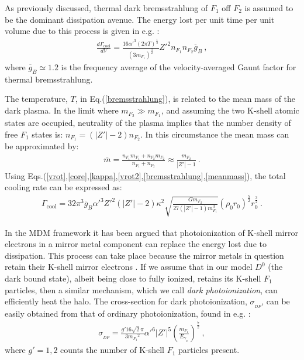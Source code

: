\documentclass[12pt]{article}
\begin{document}
{{As previously discussed, thermal dark bremsstrahlung of $F _1$ off $F
_2$ is assumed to be the dominant dissipation avenue. The energy lost
per unit time per unit volume due to this process is given in e.g.
\cite{radiative}:
%
\begin{eqnarray}
\frac{d\Gamma _{\text{cool}}}{dV} = \frac{16 {\alpha '} ^3 (2\pi T)
^{\frac{1}{2}}}{(3 m _{F_1} ) ^{\frac{3}{2}}} {Z '} ^2 n _{F_1} n _{F_2}
\overline{g} _B \ ,
\label{bremsstrahlung}
\end{eqnarray}
%
where $\overline{g} _B \simeq 1.2$ is the frequency average of the
velocity-averaged Gaunt factor for thermal bremsstrahlung. 

The temperature, $T$, in Eq.(\ref{bremsstrahlung}), is related to the
mean mass of the dark plasma. In the limit where $m _{F_2} \gg m
_{F_1}$, and assuming the two K-shell atomic states are occupied, neutrality of the plasma implies
that the number density of free $F_1$ states is: $n _{F_1} =
(|Z'|-2)n _{F_2}$. In this circumstance the mean mass can be approximated by:
%
\begin{eqnarray}
\overline{m} = \frac{n _{F_1}m _{F_1} + n _{F_2}m _{F_2}}{n _{F_1} + n
_{F_2}} \approx \frac{m _{F_2}}{|Z'|-1}
\ .
\label{meanmass}
\end{eqnarray}
%
Using
Eqs.(\ref{vrot},\ref{core},\ref{kappa},\ref{vrot2},\ref{bremsstrahlung},\ref{meanmass}),
the total cooling rate can be expressed as:
%
\begin{eqnarray}
\Gamma _{\text{cool}} = 32\pi ^3\overline{g} _B{\alpha '} ^3{Z'}
^2(|Z'|-2)\kappa ^2\sqrt{\frac{Gm _{F_2}}{27(|Z'|-1)m _{F_1} ^3}}\left (
\rho _0r _0 \right) ^{\frac{5}{2}}r _0 ^{\frac{3}{2}} \ .
\label{integratedout}
\end{eqnarray}
%

In the MDM framework it has been argued that photoionization of K-shell
mirror electrons in a mirror metal component can replace the energy lost
due to dissipation. This process can take place because the mirror
metals in question retain their K-shell mirror electrons \cite{review}.
If we assume that in our model $D ^0$ (the dark bound state), albeit
being close to fully ionized, retains its K-shell $F _1$ particles, then
a similar mechanism, which we call \textit{dark photoionization}, can
efficiently heat the halo. The cross-section for dark photoionization,
$\sigma _{_{DP}}$, can be easily obtained from that of ordinary
photoionization, found in e.g. \cite{radiative}:
%
\begin{eqnarray}
\sigma _{_{DP}} = \frac{g'16\sqrt{2}\pi}{3 {m _{F_1}} ^2} {\alpha '} ^6
{|Z'|} ^5 \left ( \frac{m _{F_1}}{E _{\gamma _{_D}}} \right )
^{\frac{7}{2}} \ ,
\label{photoionization}
\end{eqnarray}
%
where $g' = 1,2$ counts the number of K-shell $F_1$ particles present.

}}
\end{document}
